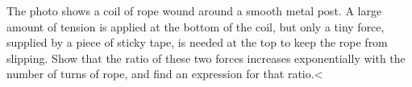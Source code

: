 The photo shows a coil of rope wound around a smooth metal post.
A large amount of tension is applied at the bottom of the coil,
but only a tiny force, supplied by a piece of sticky tape,
is needed at the top to keep the rope from slipping. Show that the
ratio of these two forces increases exponentially with the number
of turns of rope, and find an expression for that ratio.<%
